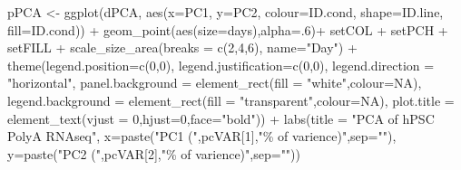 \documentclass[]{article}
\newcommand{\hlnum}[1]{\textcolor[rgb]{0.816,0.125,0.439}{#1}}%
\newcommand{\hlstr}[1]{\textcolor[rgb]{0.251,0.627,0.251}{#1}}%
\newcommand{\hlopt}[1]{\textcolor[rgb]{0,0,0}{#1}}%
\newcommand{\hlstd}[1]{\textcolor[rgb]{0.251,0.251,0.251}{#1}}%
\newcommand{\hlkwc}[1]{\textcolor[rgb]{0.251,0.251,0.251}{#1}}%
\newcommand{\hlkwd}[1]{\textcolor[rgb]{0.878,0.439,0.125}{#1}}%
\newenvironment{Shaded}{\begin{myshaded}}{\end{myshaded}}
\newcommand{\KeywordTok}[1]{\hlkwd{#1}}
\newcommand{\DataTypeTok}[1]{\hlkwc{#1}}
\newcommand{\DecValTok}[1]{\hlnum{#1}}
\newcommand{\StringTok}[1]{\hlstr{#1}}
\newcommand{\OtherTok}[1]{{#1}}
\newcommand{\OperatorTok}[1]{\hlopt{#1}}
\newcommand{\NormalTok}[1]{\hlstd{#1}}
\begin{document}
\begin{Shaded}
\begin{Highlighting}[]
\NormalTok{pPCA <{-}}\StringTok{ }\KeywordTok{ggplot}\NormalTok{(dPCA, }\KeywordTok{aes}\NormalTok{(}\DataTypeTok{x=}\NormalTok{PC1, }\DataTypeTok{y=}\NormalTok{PC2, }\DataTypeTok{colour=}\NormalTok{ID.cond, }\DataTypeTok{shape=}\NormalTok{ID.line,}
        \DataTypeTok{fill=}\NormalTok{ID.cond)) }\OperatorTok{+}
\StringTok{        }\KeywordTok{geom\_point}\NormalTok{(}\KeywordTok{aes}\NormalTok{(}\DataTypeTok{size=}\NormalTok{days),}\DataTypeTok{alpha=}\NormalTok{.}\DecValTok{6}\NormalTok{)}\OperatorTok{+}
\StringTok{        }\NormalTok{setCOL }\OperatorTok{+}\StringTok{ }\NormalTok{setPCH  }\OperatorTok{+}\StringTok{ }\NormalTok{setFILL }\OperatorTok{+}
\StringTok{        }\KeywordTok{scale\_size\_area}\NormalTok{(}\DataTypeTok{breaks =} \KeywordTok{c}\NormalTok{(}\DecValTok{2}\NormalTok{,}\DecValTok{4}\NormalTok{,}\DecValTok{6}\NormalTok{), }\DataTypeTok{name=}\StringTok{"Day"}\NormalTok{) }\OperatorTok{+}
\StringTok{        }\KeywordTok{theme}\NormalTok{(}\DataTypeTok{legend.position=}\KeywordTok{c}\NormalTok{(}\DecValTok{0}\NormalTok{,}\DecValTok{0}\NormalTok{), }\DataTypeTok{legend.justification=}\KeywordTok{c}\NormalTok{(}\DecValTok{0}\NormalTok{,}\DecValTok{0}\NormalTok{),}
              \DataTypeTok{legend.direction =} \StringTok{"horizontal"}\NormalTok{,}
              \DataTypeTok{panel.background =} \KeywordTok{element\_rect}\NormalTok{(}\DataTypeTok{fill =} \StringTok{"white"}\NormalTok{,}\DataTypeTok{colour=}\OtherTok{NA}\NormalTok{),}
              \DataTypeTok{legend.background =} \KeywordTok{element\_rect}\NormalTok{(}\DataTypeTok{fill =} \StringTok{"transparent"}\NormalTok{,}\DataTypeTok{colour=}\OtherTok{NA}\NormalTok{),}
              \DataTypeTok{plot.title =} \KeywordTok{element\_text}\NormalTok{(}\DataTypeTok{vjust =} \DecValTok{0}\NormalTok{,}\DataTypeTok{hjust=}\DecValTok{0}\NormalTok{,}\DataTypeTok{face=}\StringTok{"bold"}\NormalTok{)) }\OperatorTok{+}
\StringTok{        }\KeywordTok{labs}\NormalTok{(}\DataTypeTok{title =} \StringTok{"PCA of hPSC PolyA RNAseq"}\NormalTok{,}
            \DataTypeTok{x=}\KeywordTok{paste}\NormalTok{(}\StringTok{"PC1 ("}\NormalTok{,pcVAR[}\DecValTok{1}\NormalTok{],}\StringTok{"\% of varience)"}\NormalTok{,}\DataTypeTok{sep=}\StringTok{""}\NormalTok{),}
            \DataTypeTok{y=}\KeywordTok{paste}\NormalTok{(}\StringTok{"PC2 ("}\NormalTok{,pcVAR[}\DecValTok{2}\NormalTok{],}\StringTok{"\% of varience)"}\NormalTok{,}\DataTypeTok{sep=}\StringTok{""}\NormalTok{))}
\end{Highlighting}
\end{Shaded}
\end{document}
